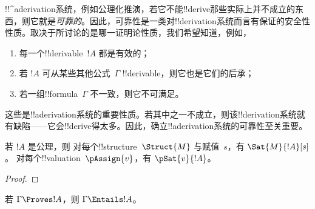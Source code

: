 \documentclass[../../../include/open-logic-section]{subfiles}
\begin{document}
      {}
      {}


\begin{explain}
!!^a{derivation}系统，例如公理化推演，若它不能!!{derive}那些实际上并不成立的东西，则它就是\emph{可靠的}。因此，可靠性是一类对!!{derivation}系统而言有保证的安全性性质。取决于所讨论的是哪一证明论性质，我们希望知道，例如，
\begin{enumerate}
\item 每一个!!{derivable}~$!A$ 都是有效的；
\item 若 $!A$ 可从某些其他公式~$\Gamma$ !!{derivable}，则它也是它们的后承；
\item 若一组!!{formula}~$\Gamma$ 不一致，则它不可满足。
\end{enumerate}
这些是!!a{derivation}系统的重要性质。若其中之一不成立，则该!!{derivation}系统就有缺陷——它会!!{derive}得太多。因此，确立!!a{derivation}系统的可靠性至关重要。
\end{explain}

\begin{prop}
  若 $!A$ 是公理，则
    {对每个!!{structure}~$\Struct{M}$ 与赋值~$s$，有 $\Sat{M}{!A}[s]$。}
    {对每个!!{valuation}~$\pAssign{v}$，有 $\pSat{v}{!A}$。}
\end{prop}

\begin{proof}
\end{proof}

\begin{thm}[可靠性]
若 $\Gamma \Proves !A$，则 $\Gamma \Entails !A$。
\end{thm}
\end{document}
